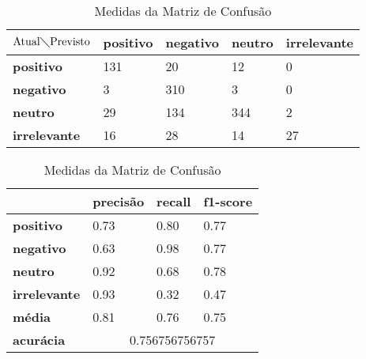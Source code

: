 \begin{table}[h!]
\centering
\begin{minipage}[b]{0.45\linewidth}
\caption{Matriz de Confusão Quaternário: \textit{Naive Bayes}}
\label{tab:mcb-nb}
\begin{tabular}{|l|l|l|l|l|}
\hline
$\textrm{Atual}\diagdown\textrm{Previsto}$ & \textbf{positivo} & \textbf{negativo} & \textbf{neutro} & \textbf{irrelevante}\\ \hline
\textbf{positivo} & 131 & 20 & 12 & 0\\ \hline
\textbf{negativo} & 3 & 310 & 3 & 0\\ \hline
\textbf{neutro} & 29 & 134 & 344 & 2\\ \hline
\textbf{irrelevante} & 16 & 28 & 14 & 27\\ \hline
\end{tabular}
\end{minipage}
\hspace{0.5cm}
\begin{minipage}[b]{0.45\linewidth}

\centering
\caption{Medidas da Matriz de Confusão}
\label{tab:mmcb-nb}
\begin{tabular}{|l|l|l|l|}
\hline
         & \textbf{precisão} & \textbf{recall} & \textbf{f1-score} \\ \hline
\textbf{positivo} & 0.73     & 0.80   & 0.77     \\ \hline
\textbf{negativo} & 0.63     & 0.98   & 0.77     \\ \hline
\textbf{neutro} & 0.92     & 0.68   & 0.78     \\ \hline
\textbf{irrelevante} & 0.93     & 0.32   & 0.47     \\ \hline
\textbf{média} & 0.81     & 0.76   & 0.75     \\ \hline
\textbf{acurácia} & \multicolumn{3}{|c|}{0.756756756757}\\ \hline
\end{tabular}
\end{minipage}
\end{table}

